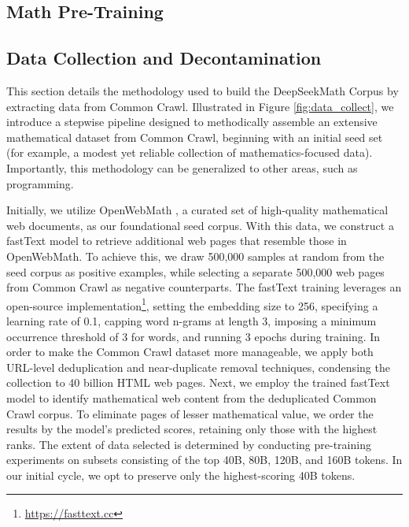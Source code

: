 \begin{itemize}[topsep=0pt]
\section{Math Pre-Training}

\subsection{Data Collection and Decontamination} This section details the methodology used to build the DeepSeekMath Corpus by extracting data from Common Crawl. Illustrated in Figure \ref{fig:data_collect}, we introduce a stepwise pipeline designed to methodically assemble an extensive mathematical dataset from Common Crawl, beginning with an initial seed set (for example, a modest yet reliable collection of mathematics-focused data). Importantly, this methodology can be generalized to other areas, such as programming.

Initially, we utilize OpenWebMath \citep{openwebmath}, a curated set of high-quality mathematical web documents, as our foundational seed corpus. With this data, we construct a fastText model \citep{joulin2016fasttext} to retrieve additional web pages that resemble those in OpenWebMath. To achieve this, we draw 500,000 samples at random from the seed corpus as positive examples, while selecting a separate 500,000 web pages from Common Crawl as negative counterparts. The fastText training leverages an open-source implementation\footnote{\url{https://fasttext.cc}}, setting the embedding size to 256, specifying a learning rate of 0.1, capping word n-grams at length 3, imposing a minimum occurrence threshold of 3 for words, and running 3 epochs during training. In order to make the Common Crawl dataset more manageable, we apply both URL-level deduplication and near-duplicate removal techniques, condensing the collection to 40 billion HTML web pages. Next, we employ the trained fastText model to identify mathematical web content from the deduplicated Common Crawl corpus. To eliminate pages of lesser mathematical value, we order the results by the model’s predicted scores, retaining only those with the highest ranks. The extent of data selected is determined by conducting pre-training experiments on subsets consisting of the top 40B, 80B, 120B, and 160B tokens. In our initial cycle, we opt to preserve only the highest-scoring 40B tokens.


\end{itemize}
